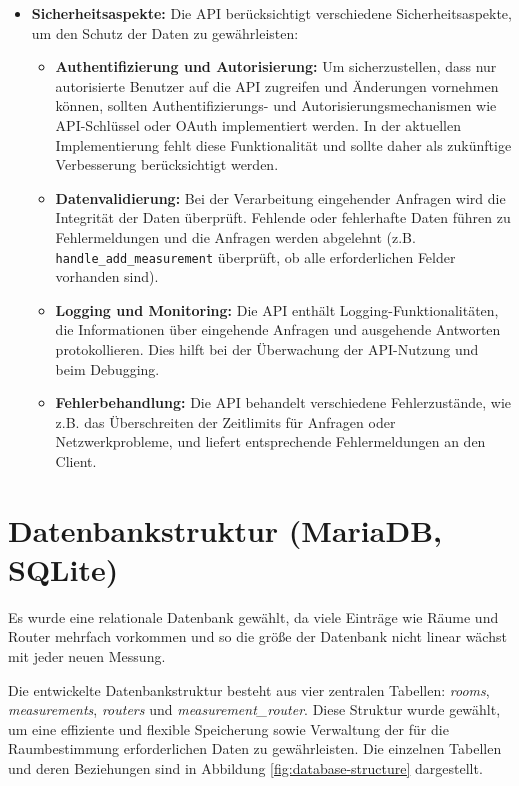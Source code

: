 \begin{itemize}
    \item \textbf{Sicherheitsaspekte:} Die API berücksichtigt verschiedene Sicherheitsaspekte, um den Schutz der Daten zu gewährleisten:
          \begin{itemize}
              \item \textbf{Authentifizierung und Autorisierung:} Um sicherzustellen, dass nur autorisierte Benutzer auf die API zugreifen und Änderungen vornehmen können, sollten Authentifizierungs- und Autorisierungsmechanismen wie API-Schlüssel oder OAuth implementiert werden. In der aktuellen Implementierung fehlt diese Funktionalität und sollte daher als zukünftige Verbesserung berücksichtigt werden.
              \item \textbf{Datenvalidierung:} Bei der Verarbeitung eingehender Anfragen wird die Integrität der Daten überprüft. Fehlende oder fehlerhafte Daten führen zu Fehlermeldungen und die Anfragen werden abgelehnt (z.B. \texttt{handle\_add\_measurement} überprüft, ob alle erforderlichen Felder vorhanden sind).
              \item \textbf{Logging und Monitoring:} Die API enthält Logging-Funktionalitäten, die Informationen über eingehende Anfragen und ausgehende Antworten protokollieren. Dies hilft bei der Überwachung der API-Nutzung und beim Debugging.
              \item \textbf{Fehlerbehandlung:} Die API behandelt verschiedene Fehlerzustände, wie z.B. das Überschreiten der Zeitlimits für Anfragen oder Netzwerkprobleme, und liefert entsprechende Fehlermeldungen an den Client.
          \end{itemize}
\end{itemize}


\section{Datenbankstruktur (MariaDB, SQLite)}

Es wurde eine relationale Datenbank gewählt, da viele Einträge wie Räume und Router mehrfach vorkommen und so die größe der Datenbank nicht linear wächst mit jeder neuen Messung.

Die entwickelte Datenbankstruktur besteht aus vier zentralen Tabellen: \textit{rooms}, \textit{measurements}, \textit{routers} und \textit{measurement\_router}. Diese Struktur wurde gewählt, um eine effiziente und flexible Speicherung sowie Verwaltung der für die Raumbestimmung erforderlichen Daten zu gewährleisten. Die einzelnen Tabellen und deren Beziehungen sind in Abbildung \ref{fig:database-structure} dargestellt.

